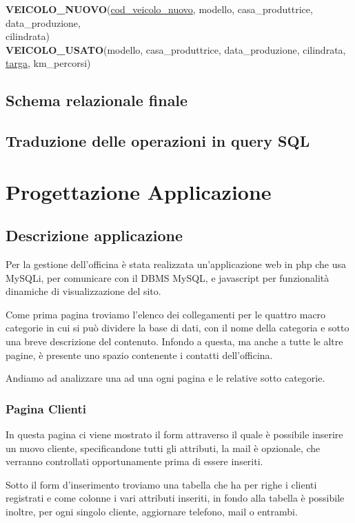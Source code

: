 \documentclass[a4paper,12pt]{report}
\begin{document}
\noindent
\textbf{VEICOLO\_NUOVO}(\underline{cod\_veicolo\_nuovo}, modello, casa\_produttrice, data\_produzione,\\
cilindrata)\\

\noindent
\textbf{VEICOLO\_USATO}(modello, casa\_produttrice, data\_produzione, cilindrata, \underline{targa}, km\_percorsi)\\

\section{Schema relazionale finale}

\section{Traduzione delle operazioni in query SQL}

\chapter{Progettazione Applicazione}

\section{Descrizione applicazione}
Per la gestione dell'officina è stata realizzata un'applicazione web in php che usa MySQLi, per  
%
comunicare con il DBMS MySQL, e javascript per funzionalità dinamiche di visualizzazione del sito.

Come prima pagina troviamo l'elenco dei collegamenti per le quattro macro categorie in cui si può dividere la base 
%
di dati, con il nome della categoria e sotto una breve descrizione del contenuto. 
%
Infondo a questa, ma anche a tutte le altre pagine, è presente uno spazio contenente i contatti dell'officina.

Andiamo ad analizzare una ad una ogni pagina e le relative sotto categorie.

\subsection*{Pagina Clienti}
In questa pagina ci viene mostrato il form attraverso il quale è possibile inserire un nuovo cliente, specificandone
%
tutti gli attributi, la mail è opzionale, che verranno controllati opportunamente prima di essere inseriti.

Sotto il form d'inserimento troviamo una tabella che ha per righe i clienti registrati e come colonne i vari attributi	
%
inseriti, in fondo alla tabella è possibile inoltre, per ogni singolo cliente, aggiornare telefono, mail o entrambi.
\end{document}
